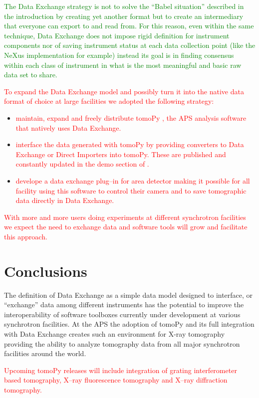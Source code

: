 \documentclass[pdf]{iucr}              %
\begin{document}
\textcolor{green}{The Data Exchange strategy is not to solve the ``Babel situation'' described in the introduction by creating yet another format but to create an intermediary that everyone can export to and read from. For this reason, even within the same technique, Data Exchange does not impose rigid definition for instrument components nor of saving instrument status at each data collection point (like the NeXus implementation for example) instead its goal is in finding consensus within each class of instrument in what is the most meaningful and basic raw data set to share.}

\textcolor{red}{To expand the Data Exchange model and possibly turn it into the native data format of choice at large facilities we adopted the following strategy:}

\begin{itemize}
\item \textcolor{red}{maintain, expand and freely distribute tomoPy \cite{python_cpp}, the APS analysis software that natively uses Data Exchange.} 
\item \textcolor{red}{interface the data generated with tomoPy by providing converters to Data Exchange or Direct Importers into tomoPy. These are published and constantly updated in the demo section of \cite{data_exchange}.}
\item \textcolor{red}{develope a data exchange plug--in for area detector \cite{area_detector} making it possible for all facility using this software to control their camera and to save tomographic data directly in Data Exchange.}
\end{itemize}


\textcolor{red}{With more and more users doing experiments at different synchrotron facilities we expect the need to exchange data and software tools will grow and facilitate this approach.}
 

\section{Conclusions}

The definition of Data Exchange as a simple data model designed to interface, or ``exchange'' data among different instruments has the potential to improve the interoperability of software toolboxes currently under development at various synchrotron facilities. At the APS the adoption of tomoPy \cite{python_cpp} and its full integration with Data Exchange creates such an environment for X-ray tomography providing the ability to analyze tomography data from all major synchrotron facilities around the world. 
\item \textcolor{red}{Upcoming tomoPy releases will include integration of grating interferometer based tomography, X--ray fluorescence tomography and X--ray diffraction tomography.}
\end{document}
